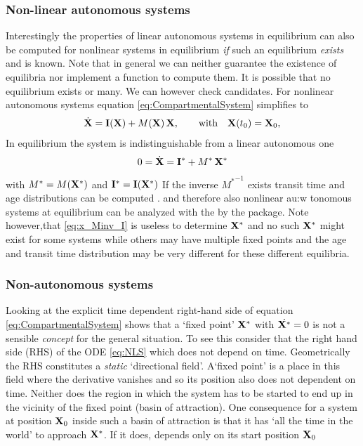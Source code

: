 \subsubsection{Non-linear autonomous systems}
Interestingly the properties of linear autonomous systems in equilibrium can
also be computed for nonlinear systems in equilibrium \emph{if} such an equilibrium
\emph{exists} and is known. Note that in general we can neither guarantee the existence of equilibria nor implement a function to compute them. It is possible that no equilibrium exists or many. We can however check candidates. 
For nonlinear autonomous systems equation \eqref{eq:CompartmentalSystem} simplifies to
\begin{equation} \label{eq:NLS}
\dot{\mathbf{X}} = \mathbf{I}(\mathbf{X}) + M(\mathbf{X}) \, \mathbf{X}, \qquad  \mathrm{with} \quad \mathbf{X}(t_0) = \mathbf{X}_0,
\end{equation}
In equilibrium the system is indistinguishable from a linear autonomous one
\begin{align} 
  0= \dot{\mathbf{X}} = \mathbf{I}^* + M^* \, \mathbf{X}^*
\end{align}
with $M^*=M(\mathbf{X}^*)$ and $\mathbf{I}^*=\mathbf{I}(\mathbf{X}^*)$ 
If the inverse ${M^*}^{-1}$ exists transit time and age distributions can be computed 
\cite{Metzler2018MGS}.
and therefore also  nonlinear au:w
tonomous
systems at equilibrium can be analyzed with the by the
\LAPM{} package.
Note however,that 
\eqref{eq:x_Minv_I} is useless to determine $\mathbf{X}^*$ and 
no such $\mathbf{X}^*$ might exist for some systems
while others may have multiple fixed points and the age and
transit time distribution may be very different for these different equilibria.

\subsubsection{Non-autonomous systems}
Looking at the explicit time dependent right-hand side of equation \eqref{eq:CompartmentalSystem} shows that a `fixed point' $\mathbf{X}^*$ with $\dot{\mathbf{X}^*}=0$ is not a sensible \emph{concept} for the general situation.
To see this consider that the right hand side (RHS) of the ODE \eqref{eq:NLS}
which does not depend on time. Geometrically the RHS constitutes a
\emph{static} `directional field'. A`fixed point' is a place in this field
where the derivative vanishes and so its position also does not dependent on
time. Neither does the region in which the system has to be started to end up
in the vicinity of the fixed point (basin of attraction). One consequence for a
system at position $\mathbf{X}_0$ inside such a basin of attraction is that it has `all
the time in the world' to approach $\mathbf{X}^*$. If it does, depends only on its start position $\mathbf{X}_0$

